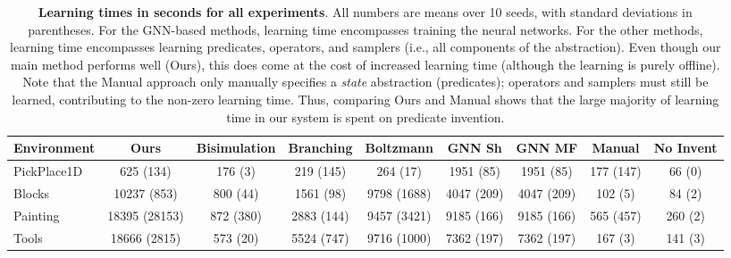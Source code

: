 \begin{table}[t]
	\centering
	\scriptsize
	
	\begin{tabular}{| l | c || c | c | c | c | c || c | c | }
	\hline
	{\bf{Environment}} &{\bf{Ours}} &
	{\bf{Bisimulation}} &
	{\bf{Branching}} &
	{\bf{Boltzmann}} &
	{\bf{GNN Sh}} &
	{\bf{GNN MF}} &
	{\bf{Manual}} &
	{\bf{No Invent}} \\
	\hline
	PickPlace1D & 625 (134) & 176 (3) & 219 (145) & 264 (17) & 1951 (85) & 1951 (85) & 177 (147) & 66 (0) \\
	Blocks & 10237 (853) & 800 (44) & 1561 (98) & 9798 (1688) & 4047 (209) &4047 (209) & 102 (5) & 84 (2) \\
	Painting & 18395 (28153) & 872 (380) & 2883 (144) & 9457 (3421) & 9185 (166) & 9185 (166) & 565 (457) & 260 (2) \\
	Tools & 18666 (2815) & 573 (20) & 5524 (747) & 9716 (1000) & 7362 (197) & 7362 (197) & 167 (3) & 141 (3) \\\hline
	\end{tabular}
	\caption{\textbf{Learning times in seconds for all experiments}. All numbers are means over 10 seeds, with standard deviations in parentheses. For the GNN-based methods, learning time encompasses training the neural networks. For the other methods, learning time encompasses learning predicates, operators, and samplers (i.e., all components of the abstraction). Even though our main method performs well (Ours), this does come at the cost of increased learning time (although the learning is purely offline). Note that the Manual approach only manually specifies a \emph{state} abstraction (predicates); operators and samplers must still be learned, contributing to the non-zero learning time. Thus, comparing Ours and Manual shows that the large majority of learning time in our system is spent on predicate invention.}
	\label{tab:learningtimeresults}
\end{table}